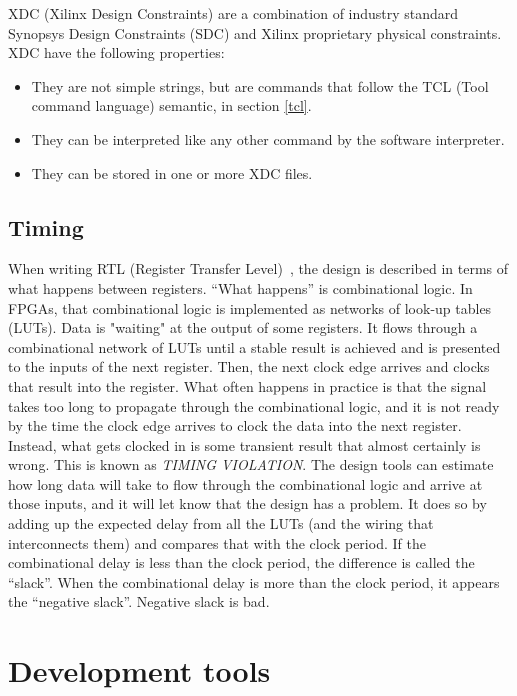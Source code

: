 \noindent XDC (Xilinx Design Constraints) are a combination of industry standard Synopsys Design Constraints (SDC) and Xilinx proprietary physical constraints.
XDC have the following properties:
\begin{itemize}
	\item They are not simple strings, but are commands that follow the TCL (Tool command language) semantic, in section \ref{tcl}.
	\item They can be interpreted like any other command by the software interpreter.
	\item They can be stored in one or more XDC files.
\end{itemize}

\subsection{Timing}
\noindent When writing RTL (Register Transfer Level)~\cite{timing}, the design is described in terms of what happens between registers. “What happens” is combinational logic. In FPGAs, that combinational logic is implemented as networks of look-up tables (LUTs). Data is "waiting" at the output of some registers. It flows through a combinational network of LUTs until a stable result is achieved and is presented to the inputs of the next register. Then, the next clock edge arrives and clocks that result into the register.
What often happens in practice is that the signal takes too long to propagate through the combinational logic, and it is not ready by the time the clock edge arrives to clock the data into the next register.
Instead, what gets clocked in is some transient result that almost certainly is wrong. This is known as \textit{TIMING VIOLATION}.
The design tools can estimate how long data will take to flow through the combinational logic and arrive at those inputs, and it will let know that the design has a problem. It does so by adding up the expected delay from all the LUTs (and the wiring that interconnects them) and compares that with the clock period.
If the combinational delay is less than the clock period, the difference is called the “slack”. When the combinational delay is more than the clock period, it appears the “negative slack”. Negative slack is bad.

\section{Development tools}

